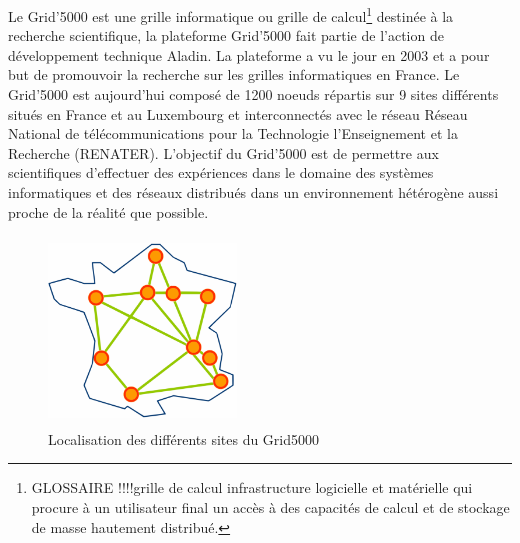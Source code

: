 \documentclass[a4paper, 10pt, onecolumn]{report}
\begin{document}
Le Grid'5000 est une grille informatique ou grille de calcul\footnote{GLOSSAIRE !!!!grille de calcul infrastructure logicielle et matérielle qui procure à un utilisateur final un accès à des capacités de calcul et de stockage de masse hautement distribué.} destinée à la recherche scientifique, la plateforme Grid'5000 fait partie de l'action de développement technique Aladin. La plateforme a vu le jour en 2003 et a pour but de promouvoir la recherche sur les grilles informatiques en France. Le Grid'5000 est aujourd'hui composé de 1200 noeuds répartis sur 9 sites différents situés en France et au Luxembourg et interconnectés avec le réseau Réseau National de télécommunications pour la Technologie l'Enseignement et la Recherche (RENATER). L'objectif du Grid'5000 est de permettre aux scientifiques d'effectuer des expériences dans le domaine des systèmes informatiques et des réseaux distribués dans un environnement hétérogène aussi proche de la réalité que possible.

	\begin{figure}[!h]
		\centering
   		\includegraphics[width=5cm,height=5cm]{map.png}
   		\caption{Localisation des différents sites du Grid5000}
    	\label{fig:map}
	\end{figure} 
\end{document}

